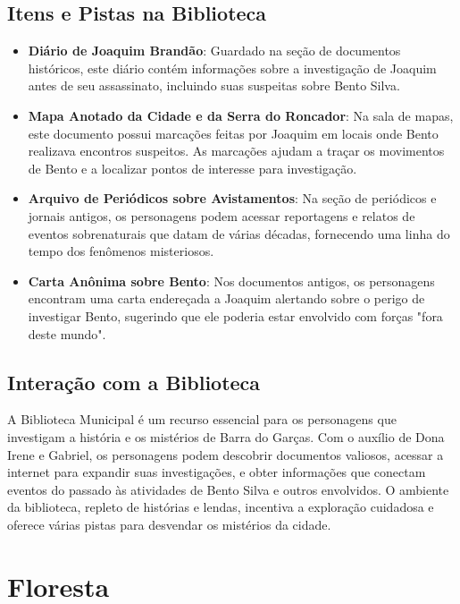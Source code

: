 \subsection{Itens e Pistas na Biblioteca}

\begin{itemize}
    \item \textbf{Diário de Joaquim Brandão}: Guardado na seção de documentos históricos, este diário contém informações sobre a investigação de Joaquim antes de seu assassinato, incluindo suas suspeitas sobre Bento Silva.

    \item \textbf{Mapa Anotado da Cidade e da Serra do Roncador}: Na sala de mapas, este documento possui marcações feitas por Joaquim em locais onde Bento realizava encontros suspeitos. As marcações ajudam a traçar os movimentos de Bento e a localizar pontos de interesse para investigação.

    \item \textbf{Arquivo de Periódicos sobre Avistamentos}: Na seção de periódicos e jornais antigos, os personagens podem acessar reportagens e relatos de eventos sobrenaturais que datam de várias décadas, fornecendo uma linha do tempo dos fenômenos misteriosos.

    \item \textbf{Carta Anônima sobre Bento}: Nos documentos antigos, os personagens encontram uma carta endereçada a Joaquim alertando sobre o perigo de investigar Bento, sugerindo que ele poderia estar envolvido com forças "fora deste mundo".
\end{itemize}

\subsection{Interação com a Biblioteca}

A Biblioteca Municipal é um recurso essencial para os personagens que investigam a história e os mistérios de Barra do Garças. Com o auxílio de Dona Irene e Gabriel, os personagens podem descobrir documentos valiosos, acessar a internet para expandir suas investigações, e obter informações que conectam eventos do passado às atividades de Bento Silva e outros envolvidos. O ambiente da biblioteca, repleto de histórias e lendas, incentiva a exploração cuidadosa e oferece várias pistas para desvendar os mistérios da cidade.



\section{Floresta}

